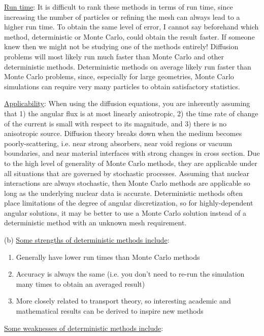 \documentclass[10pt]{article}
\begin{document}
\underline{Run time}: It is difficult to rank these methods in terms of run time, since increasing the number of particles or refining the mesh can always lead to a higher run time. To obtain the same level of error, I cannot say beforehand which method, deterministic or Monte Carlo, could obtain the result faster. If someone knew then we might not be studying one of the methods entirely! Diffusion problems will most likely run much faster than Monte Carlo and other deterministic methods. Deterministic methods on average likely run faster than Monte Carlo problems, since, especially for large geometries, Monte Carlo simulations can require very many particles to obtain satisfactory statistics.\newline

\underline{Applicability}: When using the diffusion equations, you are inherently assuming that 1) the angular flux is at most linearly anisotropic, 2) the time rate of change of the current is small with respect to its magnitude, and 3) there is no anisotropic source. Diffusion theory breaks down when the medium becomes poorly-scattering, i.e. near strong absorbers, near void regions or vacuum boundaries, and near material interfaces with strong changes in cross section. Due to the high level of generality of Monte Carlo methods, they are applicable under all situations that are governed by stochastic processes. Assuming that nuclear interactions are always stochastic, then Monte Carlo methods are applicable so long as the underlying nuclear data is accurate. Deterministic methods often place limitations of the degree of angular discretization, so for highly-dependent angular solutions, it may be better to use a Monte Carlo solution instead of a deterministic method with an unknown mesh requirement.\newline

(b) \underline{Some strengths of deterministic methods include}:

\begin{enumerate}
\item Generally have lower run times than Monte Carlo methods
\item Accuracy is always the same (i.e. you don't need to re-run the simulation many times to obtain an averaged result)
\item More closely related to transport theory, so interesting academic and mathematical results can be derived to inspire new methods
\end{enumerate} 

\underline{Some weaknesses of deterministic methods include}:
\end{document}
